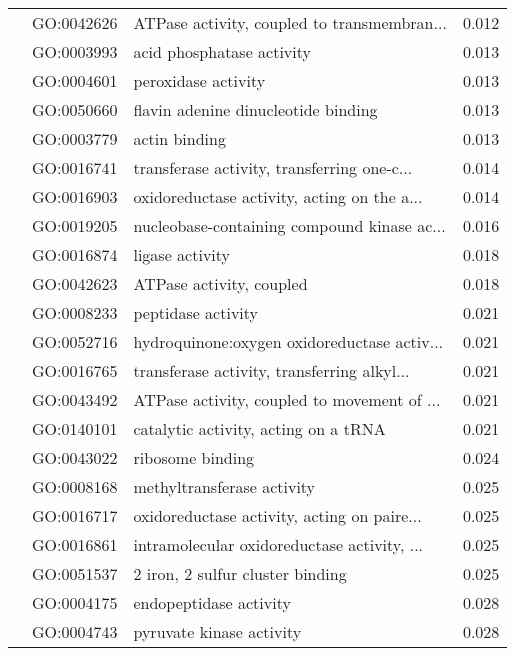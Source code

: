 \begin{longtable}{lllr}
   & GO:0042626 &  ATPase activity, coupled to transmembran... &         0.012 \\
   & GO:0003993 &                    acid phosphatase activity &         0.013 \\
   & GO:0004601 &                          peroxidase activity &         0.013 \\
   & GO:0050660 &          flavin adenine dinucleotide binding &         0.013 \\
   & GO:0003779 &                                actin binding &         0.013 \\
   & GO:0016741 &  transferase activity, transferring one-c... &         0.014 \\
   & GO:0016903 &  oxidoreductase activity, acting on the a... &         0.014 \\
   & GO:0019205 &  nucleobase-containing compound kinase ac... &         0.016 \\
   & GO:0016874 &                              ligase activity &         0.018 \\
   & GO:0042623 &                     ATPase activity, coupled &         0.018 \\
   & GO:0008233 &                           peptidase activity &         0.021 \\
   & GO:0052716 &  hydroquinone:oxygen oxidoreductase activ... &         0.021 \\
   & GO:0016765 &  transferase activity, transferring alkyl... &         0.021 \\
   & GO:0043492 &  ATPase activity, coupled to movement of ... &         0.021 \\
   & GO:0140101 &         catalytic activity, acting on a tRNA &         0.021 \\
   & GO:0043022 &                             ribosome binding &         0.024 \\
   & GO:0008168 &                   methyltransferase activity &         0.025 \\
   & GO:0016717 &  oxidoreductase activity, acting on paire... &         0.025 \\
   & GO:0016861 &  intramolecular oxidoreductase activity, ... &         0.025 \\
   & GO:0051537 &             2 iron, 2 sulfur cluster binding &         0.025 \\
   & GO:0004175 &                       endopeptidase activity &         0.028 \\
   & GO:0004743 &                     pyruvate kinase activity &         0.028 \\

\end{longtable}
